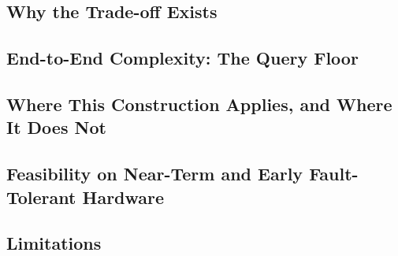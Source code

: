 %

\subsection{Why the Trade-off Exists}

\subsection{End-to-End Complexity: The Query Floor}

\subsection{Where This Construction Applies, and Where It Does Not}

\subsection{Feasibility on Near-Term and Early Fault-Tolerant Hardware}

\subsection{Limitations}
